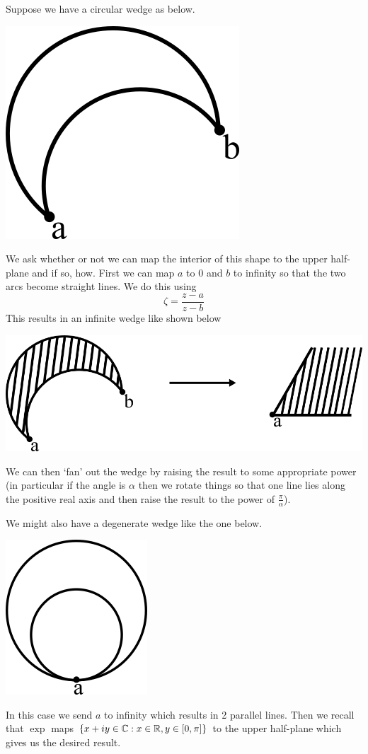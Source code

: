 Suppose we have a circular wedge as below.\\
\begin{center}
    \includegraphics[scale=0.8]{Images/circular_wedge.png}
\end{center}
We ask whether or not we can map the interior of this shape to the upper half-plane and if so, how. First we can map $a$ to 0 and $b$ to infinity so that the two arcs become straight lines. We do this using
$$ \zeta = \frac{z - a}{z - b} $$
This results in an infinite wedge like shown below
\begin{center}
    \includegraphics[scale=0.8]{Images/conformal_map.png}
\end{center}
We can then `fan' out the wedge by raising the result to some appropriate power (in particular if the angle is $\alpha$ then we rotate things so that one line lies along the positive real axis and then raise the result to the power of $\frac{\pi}{\alpha}$).

We might also have a degenerate wedge like the one below.
\begin{center}
    \includegraphics[scale=0.8]{Images/degenerate_wedge.png}
\end{center}
In this case we send $a$ to infinity which results in 2 parallel lines. Then we recall that $\exp$ maps $\{x + iy \in \mathbb{C}: x \in \mathbb{R}, y \in [0, \pi]\}$ to the upper half-plane which gives us the desired result.

